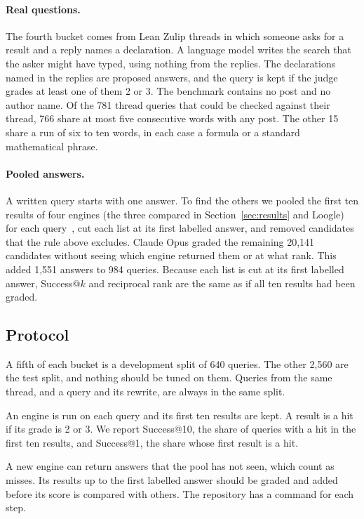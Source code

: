 \documentclass{article}
\begin{document}
\paragraph{Real questions.} The fourth bucket comes from Lean Zulip threads in
which someone asks for a result and a reply names a declaration. A language
model writes the search that the asker might have typed, using nothing from
the replies. The declarations named in the replies are proposed answers, and
the query is kept if the judge grades at least one of them 2 or 3. The
benchmark contains no post and no author name. Of the 781 thread queries that
could be checked against their thread, 766 share at most five consecutive
words with any post. The other 15 share a run of six to ten words, in each
case a formula or a standard mathematical phrase.

\paragraph{Pooled answers.} A written query starts with one answer. To find
the others we pooled the first ten results of four engines (the three compared
in Section~\ref{sec:results} and Loogle) for each
query~\cite{sparckjones1975pooling,voorhees2005trec}, cut each list at its
first labelled answer, and removed candidates that the rule above excludes.
Claude Opus graded the remaining 20,141 candidates without seeing which engine
returned them or at what rank. This added 1,551 answers to 984 queries. Because
each list is cut at its first labelled answer, Success@$k$ and reciprocal rank
are the same as if all ten results had been graded.

\subsection{Protocol}

A fifth of each bucket is a development split of 640 queries. The other 2,560
are the test split, and nothing should be tuned on them. Queries from the same
thread, and a query and its rewrite, are always in the same split.

An engine is run on each query and its first ten results are kept. A result
is a hit if its grade is 2 or 3. We report Success@10, the share of queries
with a hit in the first ten results, and Success@1, the share whose first
result is a hit.

A new engine can return answers that the pool has not seen, which count as
misses. Its results up to the first labelled answer should be graded and added
before its score is compared with others. The repository has a command for
each step.
\end{document}
